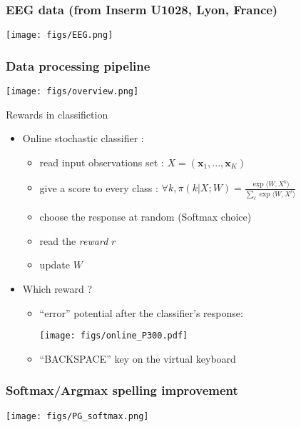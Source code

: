 \documentclass{beamer}
\begin{document}
\begin{frame}\frametitle{EEG data (from Inserm U1028, Lyon, France)}
	\texttt{[image: figs/EEG.png]}
\end{frame}

\begin{frame}\frametitle{Data processing pipeline}

	\centerline{
		\texttt{[image: figs/overview.png]}
	}
\end{frame}

\begin{frame}{Rewards in classifiction}

	\begin{itemize}

		\item Online stochastic classifier :
		\begin{itemize}
			\item read input observations set : $X = (\boldsymbol{x}_1,...,\boldsymbol{x}_K)$
			\item give a score to every class : $\forall k, \pi(k|X;W) =  \frac{\exp\langle W, X^k\rangle}
			{\sum_{\ell}  \exp\langle W, X^\ell\rangle}$ 
			\item choose the response at random (Softmax choice)
			\item read the \emph{reward} $r$
			\item update $W$
		\end{itemize}
		\item Which reward ?
		\begin{itemize}
			\item ``error'' potential after the classifier's response:
			\centerline{\texttt{[image: figs/online\_P300.pdf]}}
			\item ``BACKSPACE'' key on the virtual keyboard
		\end{itemize}
	\end{itemize}
\end{frame}

\begin{frame}\frametitle{Softmax/Argmax spelling improvement}
	\centerline{\texttt{[image: figs/PG\_softmax.png]}}
\end{frame}

\end{document}
